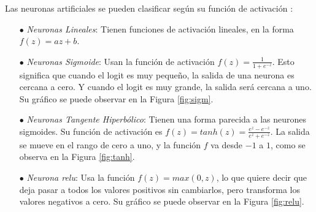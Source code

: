 Las neuronas artificiales se pueden clasificar según su función de activación \cite{Buduma}:
\begin{itemize}
    \item[$\bullet$] \textit{Neuronas Lineales}: Tienen funciones de activación lineales, en la forma $f(z) = az + b$.  
    \item[$\bullet$] \textit{Neuronas Sigmoide}: Usan la función de activación $f(z)=\displaystyle\frac{1}{1+e^{-z}}$. Esto significa que cuando el logit es muy pequeño, la salida de una neurona es cercana a cero. Y cuando el logit es muy grande, la salida será cercana a uno. Su gráfico se puede observar en la Figura \ref{fig:sigm}.
    \item[$\bullet$] \textit{Neuronas Tangente Hiperbólico}: Tienen una forma parecida a las neurones sigmoides. Su función de activación es $f(z)=tanh(z)=\displaystyle\frac{e^{z}-e^{-z}}{e^{z}+e^{-z}}$. La salida se mueve en el rango de cero a uno, y la función $f$ va desde $-1$ a $1$, como se observa en la Figura \ref{fig:tanh}.
    \item[$\bullet$] \textit{Neurona \acrshort{relu}}: Usa la función $f(z)=max(0,z)$, lo que quiere decir que deja pasar a todos los valores positivos sin cambiarlos, pero transforma los valores negativos a cero. Su gráfico se puede observar en la Figura \ref{fig:relu}.  
\end{itemize}

